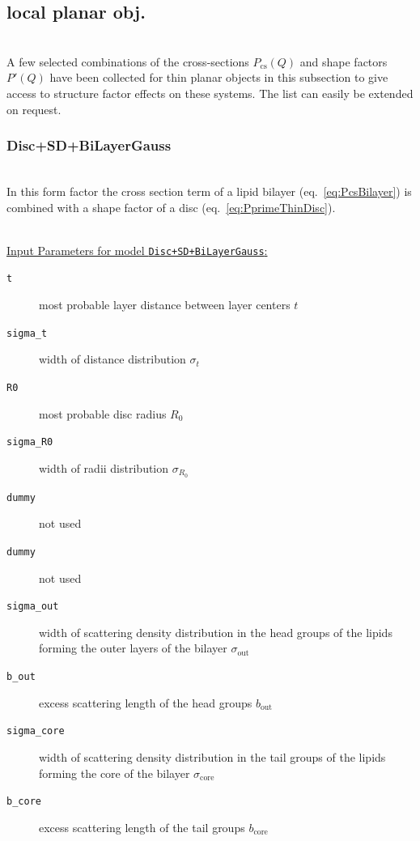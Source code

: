 \clearpage
\subsection{local planar  obj.} ~\\
\label{plugin:LocalPlanar)}
A few selected combinations of the cross-sections $P_\mathrm{cs}(Q)$ and shape factors $P'(Q)$ have been collected for thin planar objects in this subsection to give access to structure factor effects on these systems. The list can easily be extended on request.

\vspace{5mm}

\noindent
\subsubsection{Disc+SD+BiLayerGauss} ~\\

\noindent
In this form factor the cross section term of a lipid bilayer (eq.\ \ref{eq:PcsBilayer}) is combined with a shape factor of a disc (eq.\ \ref{eq:PprimeThinDisc}).

\vspace{5mm}

\hspace{1pt}\\
\uline{Input Parameters for model \texttt{Disc+SD+BiLayerGauss}:}\\
\begin{description}
\item[\texttt{t}] most probable layer distance between layer centers $t$
\item[\texttt{sigma\_t}] width of distance distribution $\sigma_t$
\item[\texttt{R0}] most probable disc radius $R_0$
\item[\texttt{sigma\_R0}] width of radii distribution $\sigma_{R_0}$
\item[\texttt{dummy}] not used
\item[\texttt{dummy}] not used
\item[\texttt{sigma\_out}] width of scattering density distribution in the head groups of the lipids forming the outer layers of the bilayer $\sigma_\mathrm{out}$
\item[\texttt{b\_out}] excess scattering length of the head groups $b_\mathrm{out}$
\item[\texttt{sigma\_core}] width of scattering density distribution in the tail groups of the lipids forming the core of the bilayer $\sigma_\mathrm{core}$
\item[\texttt{b\_core}] excess scattering length of the tail groups $b_\mathrm{core}$
\end{description}

